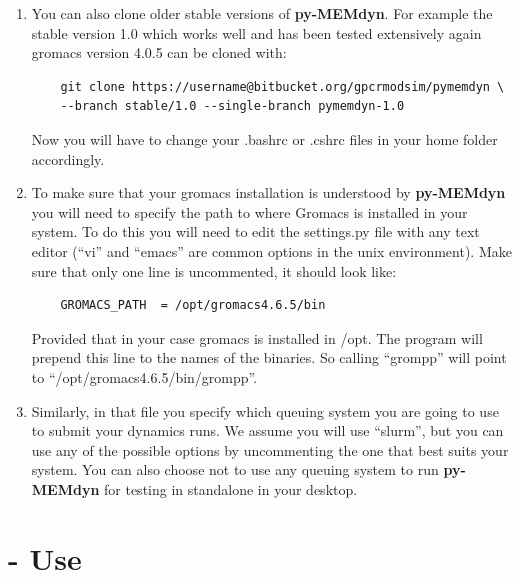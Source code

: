 \documentclass[10pt, oneside, pdftex]{article}
\begin{document}
\begin{enumerate}
\item{You    can    also    clone    older    stable    versions    of
  \textbf{py-MEMdyn}. For  example the stable version  1.0 which works
  well and has been tested extensively again gromacs version 4.0.5 can
  be cloned with:
\begin{Verbatim}
    git clone https://username@bitbucket.org/gpcrmodsim/pymemdyn \
    --branch stable/1.0 --single-branch pymemdyn-1.0
\end{Verbatim}
Now you will have to change your  .bashrc or .cshrc files in your home
folder accordingly.
}

\item{To make  sure that  your gromacs  installation is  understood by
  \textbf{py-MEMdyn}  you  will need  to  specify  the path  to  where
  Gromacs is  installed in your  system. To do  this you will  need to
  edit the settings.py file with any text editor (``vi'' and ``emacs''
  are common options in the unix environment). Make sure that only one
  line    is    uncommented, it should look  like:
\lstset{language=python, frame=single}
\begin{Verbatim}
    GROMACS_PATH  = /opt/gromacs4.6.5/bin 
\end{Verbatim}
Provided that in  your case gromacs is installed in  /opt. The program
will   prepend  this line to the names of the binaries.  So   calling
``grompp'' will point to ``/opt/gromacs4.6.5/bin/grompp''.}

\item{Similarly, in that file you specify which queuing system you are
  going to  use to submit your  dynamics runs.  We  assume you will
  use  ``slurm'', but  you  can use  any of  the  possible options  by
  uncommenting  the one  that best  suits your  system.  You  can also
  choose not to  use any queuing system to  run \textbf{py-MEMdyn} for
  testing in standalone in your desktop.}
\end{enumerate}

\section*{ - Use}
\end{document}
